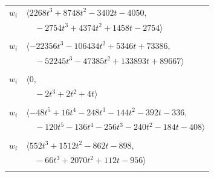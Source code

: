 \documentclass[11pt]{article}
\begin{document}
\begin{longtable}{@{}ll@{}}
$w_i$ & $\langle 2268t^{3}+8748t^{2}-3402t-4050,$\\
 & $\quad -2754t^{3}+4374t^{2}+1458t-2754\rangle$\\
\addlinespace[2pt]
\multicolumn{2}{@{}p{0.97\textwidth}@{}}{$i=56$, $D_i=72$, $e_i=2$, $\rho_{ij}$: $1{:}1, \allowbreak 15{:}1, \allowbreak 19{:}2, \allowbreak 32{:}2, \allowbreak 41{:}1, \allowbreak 42{:}1, \allowbreak 51{:}2, \allowbreak 54{:}2, \allowbreak 59{:}2, \allowbreak 61{:}1$}\\
$w_i$ & $\langle -22356t^{3}-106434t^{2}+5346t+73386,$\\
 & $\quad -52245t^{3}-47385t^{2}+133893t+89667\rangle$\\
\addlinespace[2pt]
\multicolumn{2}{@{}p{0.97\textwidth}@{}}{$i=57$, $D_i=2$, $\rho_{ij}$: $14{:}1, \allowbreak 21{:}1, \allowbreak 29{:}1, \allowbreak 30{:}1, \allowbreak 31{:}1, \allowbreak 38{:}2$}\\
$w_i$ & $\langle 0,$\\
 & $\quad -2t^{3}+2t^{2}+4t\rangle$\\
\addlinespace[2pt]
\multicolumn{2}{@{}p{0.97\textwidth}@{}}{$i=58$, $D_i=8$, $\rho_{ij}$: $3{:}1, \allowbreak 5{:}2, \allowbreak 14{:}1, \allowbreak 16{:}2, \allowbreak 17{:}1, \allowbreak 19{:}1, \allowbreak 22{:}1, \allowbreak 25{:}1, \allowbreak 33{:}2, \allowbreak 36{:}1, \allowbreak 38{:}2, \allowbreak 42{:}1, \allowbreak 47{:}2, \allowbreak 64{:}2, \allowbreak 66{:}2$}\\
$w_i$ & $\langle -48t^{5}+16t^{4}-248t^{3}-144t^{2}-392t-336,$\\
 & $\quad -120t^{5}-136t^{4}-256t^{3}-240t^{2}-184t-408\rangle$\\
\addlinespace[2pt]
\multicolumn{2}{@{}p{0.97\textwidth}@{}}{$i=59$, $D_i=16$, $\rho_{ij}$: $15{:}2, \allowbreak 21{:}1, \allowbreak 25{:}2, \allowbreak 29{:}1, \allowbreak 35{:}1, \allowbreak 42{:}2, \allowbreak 51{:}1, \allowbreak 56{:}1, \allowbreak 61{:}2, \allowbreak 71{:}2$}\\
$w_i$ & $\langle 552t^{3}+1512t^{2}-862t-898,$\\
 & $\quad -66t^{3}+2070t^{2}+112t-956\rangle$\\
\addlinespace[2pt]
\multicolumn{2}{@{}p{0.97\textwidth}@{}}{$i=60$, $D_i=128$, $\rho_{ij}$: $0{:}2, \allowbreak 8{:}2, \allowbreak 11{:}2, \allowbreak 12{:}2, \allowbreak 22{:}1, \allowbreak 24{:}1, \allowbreak 25{:}2, \allowbreak 31{:}2, \allowbreak 37{:}2, \allowbreak 38{:}1, \allowbreak 48{:}2, \allowbreak 50{:}2, \allowbreak 53{:}1, \allowbreak 55{:}2, \allowbreak 68{:}2, \allowbreak 71{:}1$}\\

\end{longtable}
\end{document}
